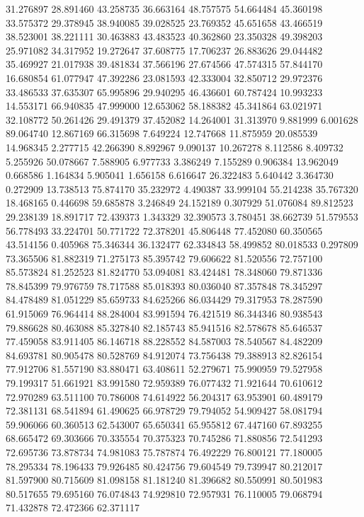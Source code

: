 31.276897
28.891460
43.258735
36.663164
48.757575
54.664484
45.360198
33.575372
29.378945
38.940085
39.028525
23.769352
45.651658
43.466519
38.523001
38.221111
30.463883
43.483523
40.362860
23.350328
49.398203
25.971082
34.317952
19.272647
37.608775
17.706237
26.883626
29.044482
35.469927
21.017938
39.481834
37.566196
27.674566
47.574315
57.844170
16.680854
61.077947
47.392286
23.081593
42.333004
32.850712
29.972376
33.486533
37.635307
65.995896
29.940295
46.436601
60.787424
10.993233
14.553171
66.940835
47.999000
12.653062
58.188382
45.341864
63.021971
32.108772
50.261426
29.491379
37.452082
14.264001
31.313970
9.881999
6.001628
89.064740
12.867169
66.315698
7.649224
12.747668
11.875959
20.085539
14.968345
2.277715
42.266390
8.892967
9.090137
10.267278
8.112586
8.409732
5.255926
50.078667
7.588905
6.977733
3.386249
7.155289
0.906384
13.962049
0.668586
1.164834
5.905041
1.656158
6.616647
26.322483
5.640442
3.364730
0.272909
13.738513
75.874170
35.232972
4.490387
33.999104
55.214238
35.767320
18.468165
0.446698
59.685878
3.246849
24.152189
0.307929
51.076084
89.812523
29.238139
18.891717
72.439373
1.343329
32.390573
3.780451
38.662739
51.579553
56.778493
33.224701
50.771722
72.378201
45.806448
77.452080
60.350565
43.514156
0.405968
75.346344
36.132477
62.334843
58.499852
80.018533
0.297809
73.365506
81.882319
71.275173
85.395742
79.606622
81.520556
72.757100
85.573824
81.252523
81.824770
53.094081
83.424481
78.348060
79.871336
78.845399
79.976759
78.717588
85.018393
80.036040
87.357848
78.345297
84.478489
81.051229
85.659733
84.625266
86.034429
79.317953
78.287590
61.915069
76.964414
88.284004
83.991594
76.421519
86.344346
80.938543
79.886628
80.463088
85.327840
82.185743
85.941516
82.578678
85.646537
77.459058
83.911405
86.146718
88.228552
84.587003
78.540567
84.482209
84.693781
80.905478
80.528769
84.912074
73.756438
79.388913
82.826154
77.912706
81.557190
83.880471
63.408611
52.279671
75.990959
79.527958
79.199317
51.661921
83.991580
72.959389
76.077432
71.921644
70.610612
72.970289
63.511100
70.786008
74.614922
56.204317
63.953901
60.489179
72.381131
68.541894
61.490625
66.978729
79.794052
54.909427
58.081794
59.906066
60.360513
62.543007
65.650341
65.955812
67.447160
67.893255
68.665472
69.303666
70.335554
70.375323
70.745286
71.880856
72.541293
72.695736
73.878734
74.981083
75.787874
76.492229
76.800121
77.180005
78.295334
78.196433
79.926485
80.424756
79.604549
79.739947
80.212017
81.597900
80.715609
81.098158
81.181240
81.396682
80.550991
80.501983
80.517655
79.695160
76.074843
74.929810
72.957931
76.110005
79.068794
71.432878
72.472366
62.371117
